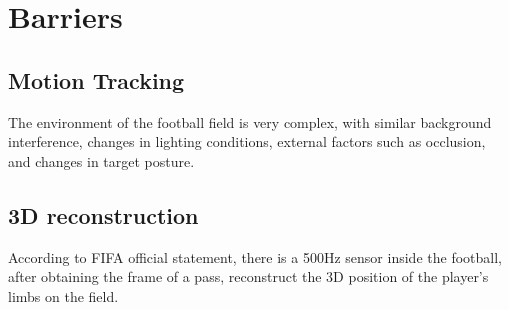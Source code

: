 \documentclass[12pt]{article}
\begin{document}
	\section{Barriers}
	\subsection{Motion Tracking}
		The environment of the football field is very complex, with similar background interference, changes in lighting conditions, external factors such as occlusion, and changes in target posture.
	\subsection{3D reconstruction}
		According to FIFA official statement, there is a 500Hz sensor inside the football, after obtaining the frame of a pass, reconstruct the 3D position of the player's limbs on the field.
\end{document}
